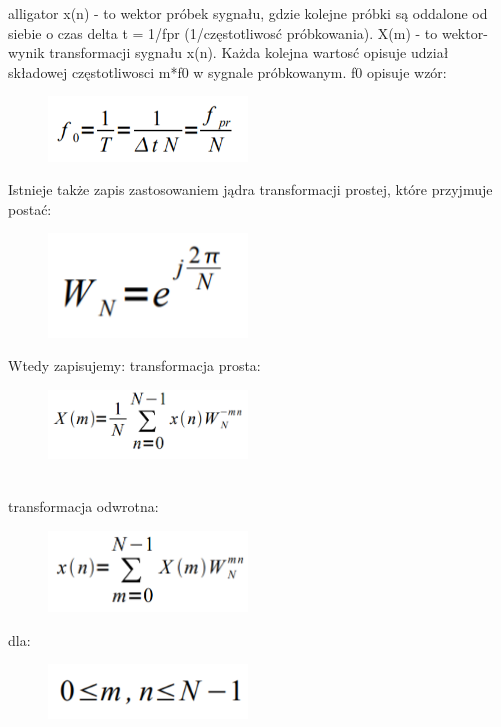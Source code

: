 \documentclass[12pt]{article}
\begin{document}
\begin{labeling}{alligator}
x(n) - to wektor próbek sygnału, gdzie kolejne próbki są oddalone od  siebie o czas delta t = 1/fpr (1/częstotliwosć próbkowania).
X(m) -  to wektor-wynik transformacji sygnału x(n). Każda kolejna wartosć opisuje udział składowej częstotliwosci m*f0 w sygnale próbkowanym.
f0 opisuje wzór:
 \\
\begin{figure}[h!]
 \centering
 \includegraphics[width=5.3cm]{f0.PNG}
 \vspace{-0.3cm}
 \label{Widok_aplikacjis}
\end{figure}
Istnieje także zapis zastosowaniem jądra transformacji prostej, które przyjmuje postać:
\begin{figure}[h!]
 \centering
 \includegraphics[width=5.3cm]{jadroW.PNG}
 \vspace{-0.3cm}
 \label{Splot_indeks}
\end{figure}
Wtedy zapisujemy:
\newpage
transformacja prosta:
\begin{figure}[h!]
 \centering
 \includegraphics[width=5.3cm]{Xm.PNG}
 \vspace{-0.3cm}
 \label{Splot_indeks}
\end{figure}
\\ transformacja odwrotna:
\begin{figure}[h!]
 \centering
 \includegraphics[width=5.3cm]{xn.PNG}
 \vspace{-0.3cm}
 \label{Splot_indeks}
\end{figure}
dla:
\begin{figure}[h!]
 \centering
 \includegraphics[width=5.3cm]{m,n.PNG}
 \vspace{-0.3cm}
 \label{Splot_indeks}
\end{figure}


\end{labeling}
\end{document}
